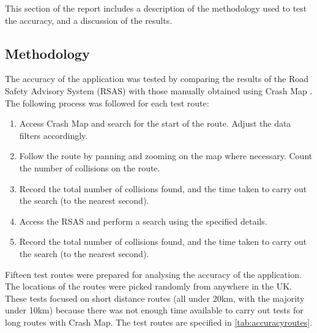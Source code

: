 \documentclass[authoryearcitations]{UoYCSproject}
\begin{document}
This section of the report includes a description of the methodology used to test the accuracy, and a discussion of the results.

\subsection{Methodology}

The accuracy of the application was tested by comparing the results of the Road Safety Advisory System (RSAS) with those manually obtained using Crash Map \citep{crashmap}. The following process was followed for each test route:

\begin{enumerate}
	\item Access Crash Map and search for the start of the route. Adjust the data filters accordingly.
	\item Follow the route by panning and zooming on the map where necessary. Count the number of collisions on the route.
	\item Record the total number of collisions found, and the time taken to carry out the search (to the nearest second).
	\item Access the RSAS and perform a search using the specified details.
	\item Record the total number of collisions found, and the time taken to carry out the search (to the nearest second).
\end{enumerate}

Fifteen test routes were prepared for analysing the accuracy of the application. The locations of the routes were picked randomly from anywhere in the UK. These tests focused on short distance routes (all under 20km, with the majority under 10km) because there was not enough time available to carry out tests for long routes with Crash Map. The test routes are specified in \autoref{tab:accuracyroutes}.
\end{document}
